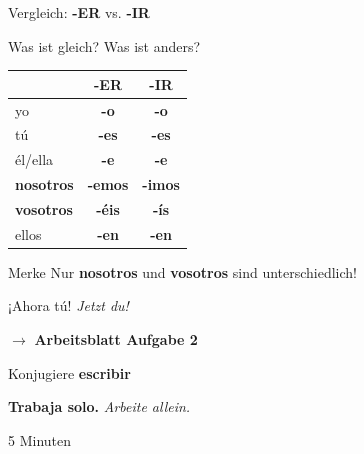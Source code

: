 \documentclass[aspectratio=169, 11pt]{beamer}
\newcommand{\seriftext}[1]{{\fontfamily{ppl}\selectfont #1}}
\newcommand{\es}[1]{\seriftext{\textbf{#1}}}
\newcommand{\de}[1]{\textit{\textcolor{mittelgrau}{#1}}}
\newcommand{\abmark}[1]{{\Large$\rightarrow$ \textbf{Arbeitsblatt Aufgabe #1}}}
\newcommand{\zeit}[1]{{\small\textcolor{mittelgrau}{#1}}}
\newcommand{\ender}[1]{\textcolor{endungER}{\textbf{#1}}}
\newcommand{\endir}[1]{\textcolor{endungIR}{\textbf{#1}}}
\begin{document}
\begin{frame}{Vergleich: \ender{-ER} vs. \endir{-IR}}
    \vspace{0.5cm}

    {\large Was ist gleich? Was ist anders?}

    \vspace{0.6cm}

    \renewcommand{\arraystretch}{1.5}
    \begin{tabular}{l|cc}
        & \ender{-ER} & \endir{-IR} \\
        \hline
        yo & \ender{-o} & \endir{-o} \\
        tú & \ender{-es} & \endir{-es} \\
        él/ella & \ender{-e} & \endir{-e} \\
        \textbf{nosotros} & \ender{-emos} & \endir{-imos} \\
        \textbf{vosotros} & \ender{-éis} & \endir{-ís} \\
        ellos & \ender{-en} & \endir{-en} \\
    \end{tabular}

    \vspace{0.6cm}

    \begin{block}{Merke}
        Nur \textbf{nosotros} und \textbf{vosotros} sind unterschiedlich!
    \end{block}
\end{frame}

\begin{frame}{¡Ahora tú! \de{Jetzt du!}}
    \vspace{1cm}

    \begin{center}
        \abmark{2}

        \vspace{0.8cm}

        {\large Konjugiere \es{escribir}}

        \vspace{0.8cm}

        \es{Trabaja solo.} \de{Arbeite allein.}

        \vspace{0.5cm}

        \zeit{5 Minuten}
    \end{center}
\end{frame}

\end{document}

